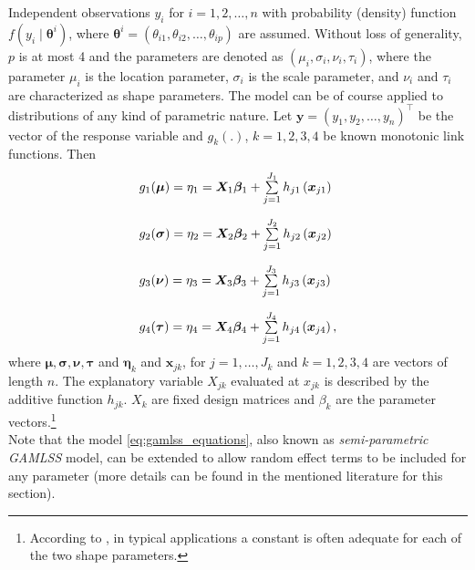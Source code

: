 Independent observations $y_i$ for $i=1,2,\ldots,n$ with probability (density) function $f\left(y_{i} \mid \boldsymbol{\theta}^{i}\right)$, where $\boldsymbol{\theta}^{i}=\left(\theta_{i 1}, \theta_{i 2}, \ldots, \theta_{i p}\right)$ are assumed. Without loss of generality, $p$ is at most 4 and the parameters are denoted as $\left(\mu_{i}, \sigma_{i}, \nu_{i}, \tau_{i}\right)$, where the parameter $\mu_i$ is the location parameter, $\sigma_i$ is the scale parameter, and $\nu_i$ and $\tau_i$ are characterized as shape parameters. The model can be of course applied to distributions of any kind of parametric nature. Let $\mathbf{y}=\left(y_{1}, y_{2}, \ldots, y_{n}\right)^{\top}$ be the vector of the response variable and $g_k(.)$, $k = 1,2,3,4$ be known monotonic link functions. Then 
\begin{equation}
\begin{array}{l}
g_{1}(\boldsymbol{\mu})=\eta_{1}=\mathbf{X}_{1} \boldsymbol{\beta}_{1}+\sum\limits_{j=1}^{J_{1}} h_{j 1}\left(\mathbf{x}_{j 1}\right) \\ \noalign{\vskip10pt}
g_{2}(\boldsymbol{\sigma})=\eta_{2}=\mathbf{X}_{2} \boldsymbol{\beta}_{2}+\sum\limits_{j=1}^{J_{2}} h_{j 2}\left(\mathbf{x}_{j 2}\right) \\ \noalign{\vskip10pt}
g_{3}(\boldsymbol{\nu})=\eta_{3}=\mathbf{X}_{3} \boldsymbol{\beta}_{3}+\sum\limits_{j=1}^{J_{3}} h_{j 3}\left(\mathbf{x}_{j 3}\right) \\ \noalign{\vskip10pt}
g_{4}(\boldsymbol{\tau})=\eta_{4}=\mathbf{X}_{4} \boldsymbol{\beta}_{4}+\sum\limits_{j=1}^{J_{4}} h_{j 4}\left(\mathbf{x}_{j 4}\right),
\end{array}
\label{eq:gamlss_equations}
\end{equation}
where $\bm{\mu}, \bm{\sigma}, \bm{\nu}, \bm{\tau}$ and $\bm{\eta}_k$ and $\bm{x}_{jk}$, for $j=1,\ldots,J_k$ and $k=1,2,3,4$ are vectors of length $n$. The explanatory variable $X_{jk}$ evaluated at $x_{jk}$ is described by the additive function $h_{jk}$. $X_k$ are fixed design matrices and $\beta_k$ are the parameter vectors.\footnote{According to \cite{stasinopoulos2007generalized}, in typical applications a constant is often adequate for each of the two shape parameters.}
\\

Note that the model \ref{eq:gamlss_equations}, also known as \textit{semi-parametric \ac{GAMLSS}} model, can be extended to allow random effect terms to be included for any parameter (more details can be found in the mentioned literature for this section).














